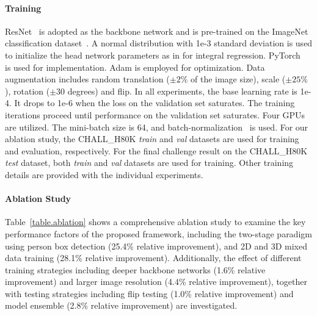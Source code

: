 \documentclass[runningheads]{llncs}
\begin{document}
\paragraph{\textbf{Training}} ResNet~\cite{he2016deep} is adopted as the backbone network and is pre-trained on the ImageNet classification dataset~\cite{deng2009imagenet}. A normal distribution with 1e-3 standard deviation is used to initialize the head network parameters as in \cite{sun2017integral} for integral regression. PyTorch~\cite{paszke2017automatic} is used for implementation. Adam is employed for optimization. Data augmentation includes random translation ($\pm2\%$ of the image size), scale ($\pm25\%$), rotation ($\pm30$ degrees) and flip. In all experiments, the base learning rate is 1e-4. It drops to 1e-6 when the loss on the validation set saturates. The training iterations proceed until performance on the validation set saturates. Four GPUs are utilized. The mini-batch size is 64, and batch-normalization~\cite{ioffe2015batch} is used. For our ablation study, the CHALL\_H80K \emph{train} and \emph{val} datasets are used for training and evaluation, respectively. For the final challenge result on the CHALL\_H80K \emph{test} dataset, both \emph{train} and \emph{val} datasets are used for training. Other training details are provided with the individual experiments.

\paragraph{\textbf{Ablation Study}} Table~\ref{table.ablation} shows a comprehensive ablation study to examine the key performance factors of the proposed framework, including the two-stage paradigm using person box detection (25.4\% relative improvement), and 2D and 3D mixed data training (28.1\% relative improvement). Additionally, the effect of different training strategies including deeper backbone networks (1.6\% relative improvement) and larger image resolution (4.4\% relative improvement), together with testing strategies including flip testing (1.0\% relative improvement) and model ensemble (2.8\% relative improvement) are investigated.
\end{document}
